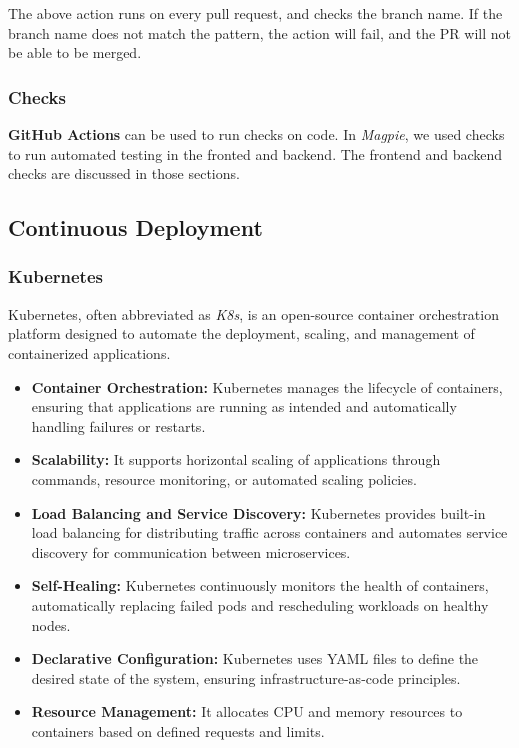 The above action runs on every pull request, and checks the branch name. If the
branch name does not match the pattern, the action will fail, and the PR will
not be able to be merged.

\subsubsection{Checks}

\textbf{GitHub Actions} can be used to run checks on code. In \textit{Magpie},
we used checks to run automated testing in the fronted and backend. The frontend
and backend checks are discussed in those sections.

\subsection{Continuous Deployment}

\subsubsection{Kubernetes}
Kubernetes, often abbreviated as \textit{K8s}, is an open-source container
orchestration platform designed to automate the deployment, scaling, and
management of containerized applications.

\begin{itemize}
    \item \textbf{Container Orchestration:} Kubernetes manages the lifecycle of
    containers, ensuring that applications are running as intended and
    automatically handling failures or restarts.
    \item \textbf{Scalability:} It supports horizontal scaling of applications
    through commands, resource monitoring, or automated scaling policies.
    \item \textbf{Load Balancing and Service Discovery:} Kubernetes provides
    built-in load balancing for distributing traffic across containers and
    automates service discovery for communication between microservices.
    \item \textbf{Self-Healing:} Kubernetes continuously monitors the health of
    containers, automatically replacing failed pods and rescheduling workloads
    on healthy nodes.
    \item \textbf{Declarative Configuration:} Kubernetes uses YAML files
    to define the desired state of the system, ensuring infrastructure-as-code
    principles.
    \item \textbf{Resource Management:} It allocates CPU and memory resources to
    containers based on defined requests and limits.
\end{itemize}

